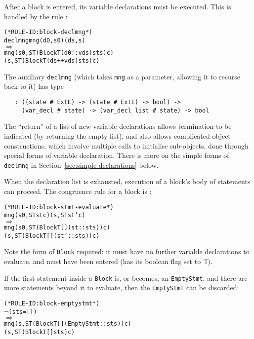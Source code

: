 \documentclass[11pt]{article}
\begin{document}
After a block is entered, its variable declarations must be executed.
This is handled by the rule :
\begin{center}
\begin{minipage}{\textwidth}
\begin{alltt}
(* RULE-ID: block-declmng *)
     declmng mng (d0, s0) (ds, s)
   \(\Rightarrow\)
     mng (s0, ST (Block T (d0 :: vds) sts) c)
         (s, ST (Block T (ds ++ vds) sts) c)
\end{alltt}
\end{minipage}
\end{center}
%
The auxiliary \texttt{declmng} (which takes \texttt{mng} as a
parameter, allowing it to recurse back to it) has type
\begin{verbatim}
   : ((state # ExtE) -> (state # ExtE) -> bool) ->
     (var_decl # state) -> (var_decl list # state) -> bool
\end{verbatim}
The ``return'' of a list of new variable declarations allows
termination to be indicated (by returning the empty list), and also
allows complicated object constructions, which involve multiple calls
to initialise sub-objects, done through special forms of variable
declaration.  There is more on the simple forms of \texttt{declmng} in
Section~\ref{sec:simple-declarations} below.

When the declaration list is exhausted, execution of a block's body of
statements can proceed.  The congruence rule for a block is
:
\begin{center}
\begin{minipage}{\textwidth}
%
\begin{alltt}
(* RULE-ID: block-stmt-evaluate *)
     mng (s0, ST st c) (s, ST st' c)
   \(\Rightarrow\)
     mng (s0, ST (Block T [] (st :: sts)) c)
         (s, ST (Block T [] (st' :: sts)) c)
\end{alltt}
\end{minipage}
\end{center}
Note the form of \texttt{Block} required: it must have no further
variable declarations to evaluate, and must have been entered (has its
boolean flag set to~\texttt{T}).

If the first statement inside a \texttt{Block} is, or becomes, an
\texttt{EmptyStmt}, and there are more statements beyond it to
evaluate, then the \texttt{EmptyStmt} can be discarded:
\begin{center}
  \begin{minipage}{\textwidth}
\begin{alltt}
(* RULE-ID: block-emptystmt *)
     \(\neg\)(sts = [])
   \(\Rightarrow\)
     mng (s, ST (Block T [] (EmptyStmt::sts)) c)
         (s, ST (Block T [] sts) c)
\end{alltt}
\end{minipage}
\end{center}
\end{document}
